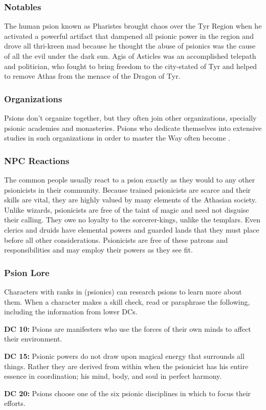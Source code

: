 \subsubsection{Notables}
The human psion known as Pharistes brought chaos over the Tyr Region when he activated a powerful artifact that dampened all psionic power in the region and drove all thri-kreen mad because he thought the abuse of psionics was the cause of all the evil under the dark sun. Agis of Asticles was an accomplished telepath and politician, who fought to bring freedom to the city-stated of Tyr and helped to remove Athas from the menace of the Dragon of Tyr.

\subsubsection{Organizations}
Psions don't organize together, but they often join other organizations, specially psionic academies and monasteries. Psions who dedicate themselves into extensive studies in such organizations in order to master the Way often become .

\subsubsection{NPC Reactions}
The common people usually react to a psion exactly as they would to any other psionicists in their community. Because trained psionicists are scarce and their skills are vital, they are highly valued by many elements of the Athasian society. Unlike wizards, psionicists are free of the taint of magic and need not disguise their calling. They owe no loyalty to the sorcerer-kings, unlike the templars. Even clerics and druids have elemental powers and guarded lands that they must place before all other considerations. Psionicists are free of these patrons and responsibilities and may employ their powers as they see fit.

\subsubsection{Psion Lore}
Characters with ranks in  (psionics) can research psions to learn more about them. When a character makes a skill check, read or paraphrase the following, including the information from lower DCs.

\textbf{DC 10:} Psions are manifesters who use the forces of their own minds to affect their environment.

\textbf{DC 15:} Psionic powers do not draw upon magical energy that surrounds all things. Rather they are derived from within when the psionicist has his entire essence in coordination; his mind, body, and soul in perfect harmony.

\textbf{DC 20:} Psions choose one of the six psionic disciplines in which to focus their efforts.
